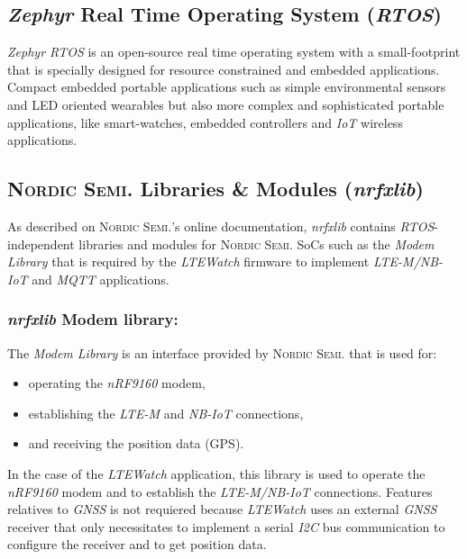 \documentclass[report.tex]{subfiles}
\begin{document}
\pagebreak

\subsection{\textit{Zephyr} Real Time Operating System (\textit{RTOS})}

\textit{Zephyr RTOS} is an open-source real time operating system with a small-footprint that is specially designed for resource constrained and embedded applications. Compact embedded portable applications such as simple environmental sensors and LED oriented wearables but also more complex and sophisticated portable applications, like smart-watches, embedded controllers and \textit{IoT} wireless applications.

\subsection{\textsc{Nordic Semi.} Libraries \& Modules (\textit{nrfxlib})}

As described on \textsc{Nordic Semi.}'s online documentation\cite{nrfxlib}, \textit{nrfxlib} contains \textit{RTOS}-independent libraries and modules for \textsc{Nordic Semi.} SoCs such as the \textit{Modem Library} that is required by the \textit{LTEWatch} firmware to implement \textit{LTE-M/NB-IoT} and \textit{MQTT} applications.

\subsubsection{\textit{nrfxlib} Modem library:}

The \textit{Modem Library} is an interface provided by \textsc{Nordic Semi.} that is used for:
\begin{itemize}
\item operating the \textit{nRF9160} modem,
\item establishing the \textit{LTE-M} and \textit{NB-IoT} connections,
\item and receiving the position data (GPS).
\end{itemize}

In the case of the \textit{LTEWatch} application, this library is used to operate the \textit{nRF9160} modem and to establish the \textit{LTE-M/NB-IoT} connections. Features relatives to \textit{GNSS} is not requiered because \textit{LTEWatch} uses an external \textit{GNSS} receiver that only necessitates to implement a serial \textit{I2C} bus communication to configure the receiver and to get position data.
\end{document}
